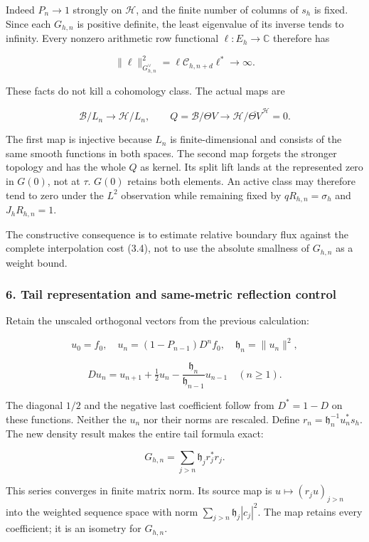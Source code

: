 Indeed \(P_n\to1\) strongly on \(\mathcal H\), and the finite number of
columns of \(s_h\) is fixed. Since each \(G_{h,n}\) is positive
definite, the least eigenvalue of its inverse tends to infinity. Every
nonzero arithmetic row functional \(\ell:E_h\to\mathbb C\) therefore has

\[\boxed{\|\ell\|_{G_{h,n}^{\vee}}^2=
\ell\mathcal C_{h,n+d}\ell^*\longrightarrow\infty.}\tag{5.2}\]

These facts do not kill a cohomology class. The actual maps are

\[\mathscr B/L_n\longrightarrow\mathcal H/L_n,\qquad
Q=\mathscr B/\Theta V\longrightarrow\mathcal H/\overline{\Theta V}^{\mathcal H}=0.\tag{5.3}\]

The first map is injective because \(L_n\) is finite-dimensional and
consists of the same smooth functions in both spaces. The second map
forgets the stronger topology and has the whole \(Q\) as kernel. Its
split lift lands at the represented zero in \(G(0)\), not at \(\tau\).
\(G(0)\) retains both elements. An active class may therefore tend to
zero under the \(L^2\) observation while remaining fixed by
\(qR_{h,n}=\sigma_h\) and \(J_hR_{h,n}=1\).

The constructive consequence is to estimate relative boundary flux
against the complete interpolation cost (3.4), not to use the absolute
smallness of \(G_{h,n}\) as a weight bound.

\subsubsection{6. Tail representation and same-metric reflection
control}\label{pr_14:tail-representation-and-same-metric-reflection-control}

Retain the unscaled orthogonal vectors from the previous calculation:

\[u_0=f_0,\quad u_n=(1-P_{n-1})D^nf_0,\quad\mathfrak h_n=\|u_n\|^2,\]

\[Du_n=u_{n+1}+\tfrac12u_n-\frac{\mathfrak h_n}{\mathfrak h_{n-1}}u_{n-1}\quad(n\ge1).\tag{6.1}\]

The diagonal \(1/2\) and the negative last coefficient follow from
\(D^*=1-D\) on these functions. Neither the \(u_n\) nor their norms are
rescaled. Define \(r_n=\mathfrak h_n^{-1}u_n^*s_h\). The new density
result makes the entire tail formula exact:

\[\boxed{G_{h,n}=\sum_{j>n}\mathfrak h_j r_j^*r_j.}\tag{6.2}\]

This series converges in finite matrix norm. Its source map is
\(u\mapsto(r_j u)_{j>n}\) into the weighted sequence space with norm
\(\sum_{j>n}\mathfrak h_j|c_j|^2\). The map retains every coefficient;
it is an isometry for \(G_{h,n}\).

